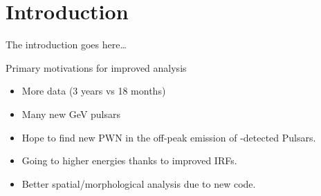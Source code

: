 \section{Introduction}

The introduction goes here\ldots


Primary motivations for improved analysis
\begin{itemize}
  \item More data (3 years vs 18 months)
  \item Many new GeV pulsars
  \item Hope to find new PWN in the off-peak emission of \lat-detected \gev Pulsars.
  \item Going to higher energies thanks to improved IRFs.
  \item Better spatial/morphological analysis due to new \pointlike code.
\end{itemize}
